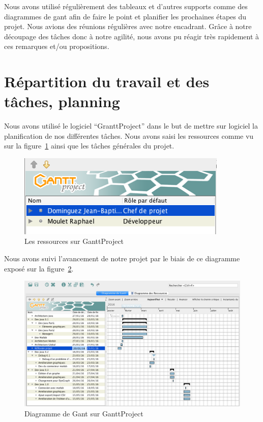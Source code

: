 \documentclass[pidr]{tnreport}
\begin{document}
Nous avons utilisé régulièrement des tableaux et d’autres supports comme des diagrammes de gant afin de faire le point et planifier les prochaines étapes du projet. Nous avions des réunions régulières avec notre encadrant. Grâce à notre découpage des tâches donc à notre agilité, nous avons pu réagir très rapidement à ces remarques et/ou propositions.


\section{Répartition du travail et des tâches, planning}

Nous avons utilisé le logiciel “GranttProject” dans le but de mettre sur logiciel la planification de nos différentes tâches. Nous avons saisi les ressources comme vu sur la figure~\ref{fig:gantt_ressources} ainsi que les tâches générales du projet.

\begin{figure}[h]
  \centering
  \includegraphics[width=10cm]{figures/gantt_ressources}
  \caption{Les ressources sur GanttProject}
  \label{fig:gantt_ressources}
\end{figure}

Nous avons suivi l’avancement de notre projet par le biais de ce diagramme exposé sur la figure~\ref{fig:gantt_taches}.

\begin{figure}[h]
  \centering
  \includegraphics[width=17cm]{figures/gantt_taches}
  \caption{Diagramme de Gant sur GanttProject}
  \label{fig:gantt_taches}
\end{figure}
\end{document}

